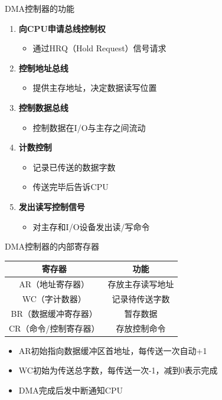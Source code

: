 \documentclass[10pt, aspectratio=169]{beamer}
\begin{document}
\begin{frame}{DMA控制器的功能}
    \begin{enumerate}
        \item \textbf{向CPU申请总线控制权}
            \begin{itemize}
                \item 通过HRQ（Hold Request）信号请求
            \end{itemize}
        \item \textbf{控制地址总线}
            \begin{itemize}
                \item 提供主存地址，决定数据读写位置
            \end{itemize}
        \item \textbf{控制数据总线}
            \begin{itemize}
                \item 控制数据在I/O与主存之间流动
            \end{itemize}
        \item \textbf{计数控制}
            \begin{itemize}
                \item 记录已传送的数据字数
                \item 传送完毕后告诉CPU
            \end{itemize}
        \item \textbf{发出读写控制信号}
            \begin{itemize}
                \item 对主存和I/O设备发出读/写命令
            \end{itemize}
    \end{enumerate}
\end{frame}

\begin{frame}{DMA控制器的内部寄存器}
    \begin{center}
        \begin{tabular}{|c|c|}
            \hline
            \textbf{寄存器} & \textbf{功能} \\
            \hline
            AR（地址寄存器） & 存放主存读写地址 \\
            WC（字计数器） & 记录待传送字数 \\
            BR（数据缓冲寄存器） & 暂存数据 \\
            CR（命令/控制寄存器） & 存放控制命令 \\
            \hline
        \end{tabular}
    \end{center}
    \vspace{0.5em}
    \begin{itemize}
        \item AR初始指向数据缓冲区首地址，每传送一次自动+1
        \item WC初始为传送总字数，每传送一次-1，减到0表示完成
        \item DMA完成后发中断通知CPU
    \end{itemize}
\end{frame}
\end{document}
